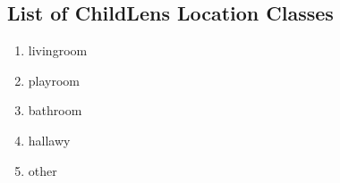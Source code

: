 \documentclass[
  man,floatsintext]{apa6}
\providecommand{\tightlist}{%
  \setlength{\itemsep}{0pt}\setlength{\parskip}{0pt}}
\begin{document}
\subsection{List of ChildLens Location Classes}\label{list-of-childlens-location-classes}

\begin{enumerate}
\def\labelenumi{\arabic{enumi}.}
\tightlist
\item
  livingroom
\item
  playroom
\item
  bathroom
\item
  hallawy
\item
  other
\end{enumerate}
\end{document}
